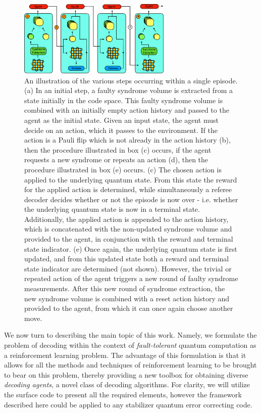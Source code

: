 \documentclass[twocolumn,preprintnumbers,amsmath,amssymb,notitlepage,nofootinbib,longbibliography,superscriptaddress,aps,pra,10pt]{revtex4-1}
\begin{document}
	\begin{figure}
		\centering
		\includegraphics[width=0.65\textwidth]{figures/decoding_as_rl.pdf}
		\caption{
			An illustration of the various steps occurring within a single episode.
			(a) In an initial step, a faulty syndrome volume is extracted from a state initially in the code space.
			This faulty syndrome volume is combined with an initially empty action history and passed to the agent as the initial state.
			Given an input state, the agent must decide on an action, which it passes to the environment.
			If the action is a Pauli flip which is not already in the action history (b), then the procedure illustrated in box (c) occurs, if the agent requests a new syndrome or repeats an action (d), then the procedure illustrated in box (e) occurs.
			(c) The chosen action is applied to the underlying quantum state.
			From this state the reward for the applied action is determined, while simultaneously a referee decoder decides whether or not the episode is now over - i.e.
			whether the underlying quantum state is now in a terminal state.
			Additionally, the applied action is appended to the action history, which is concatenated with the non-updated syndrome volume and provided to the agent, in conjunction with the reward and terminal state indicator.
			(e) Once again, the underlying quantum state is first updated, and from this updated state both a reward and terminal state indicator are determined (not shown).
			However, the trivial or repeated action of the agent triggers a new round of faulty syndrome measurements.
			After this new round of syndrome extraction, the new syndrome volume is combined with a reset action history and provided to the agent, from which it can once again choose another move.
		}
		\label{f:single_episode}
	\end{figure}

	We now turn to describing the main topic of this work.
	Namely, we formulate the problem of decoding within the context of \emph{fault-tolerant} quantum computation as a reinforcement learning problem.
	The advantage of this formulation is that it allows for all the methods and techniques of reinforcement learning to be brought to bear on this problem, thereby providing a new toolbox for obtaining diverse \emph{decoding agents}, a novel class of decoding algorithms.
	For clarity, we will utilize the surface code to present all the required elements, however the framework described here could be applied to any stabilizer quantum error correcting code.
\end{document}
